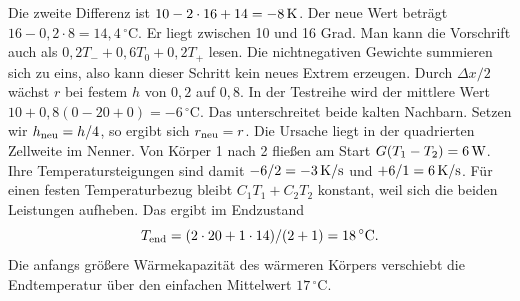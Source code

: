 Die zweite Differenz ist \(10-2\cdot16+14=-8\,\mathrm{K}\). Der neue Wert beträgt \(16-0{,}2\cdot8=14{,}4\,^\circ\mathrm C\). Er liegt zwischen 10 und 16 Grad. Man kann die Vorschrift auch als \(0{,}2T_-+0{,}6T_0+0{,}2T_+\) lesen. Die nichtnegativen Gewichte summieren sich zu eins, also kann dieser Schritt kein neues Extrem erzeugen.
Durch \(\Delta x/2\) wächst \(r\) bei festem \(h\) von \(0{,}2\) auf \(0{,}8\). In der Testreihe wird der mittlere Wert \(10+0{,}8(0-20+0)=-6\,^\circ\mathrm C\). Das unterschreitet beide kalten Nachbarn. Setzen wir \(h_{\rm neu}=h/4\), so ergibt sich \(r_{\rm neu}=r\). Die Ursache liegt in der quadrierten Zellweite im Nenner.
Von Körper 1 nach 2 fließen am Start \(G(T_1-T_2)=6\,\mathrm{W}\). Ihre Temperatursteigungen sind damit \(-6/2=-3\,\mathrm{K/s}\) und \(+6/1=6\,\mathrm{K/s}\). Für einen festen Temperaturbezug bleibt \(C_1T_1+C_2T_2\) konstant, weil sich die beiden Leistungen aufheben. Das ergibt im Endzustand
\[
 T_{\rm end}=(2\cdot20+1\cdot14)/(2+1)=18\,^\circ\mathrm C.
\]
Die anfangs größere Wärmekapazität des wärmeren Körpers verschiebt die Endtemperatur über den einfachen Mittelwert \(17\,^\circ\mathrm C\).


